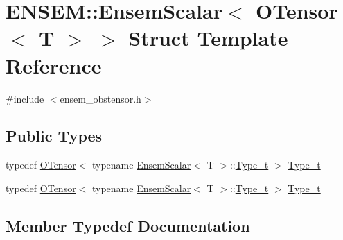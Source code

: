 \hypertarget{structENSEM_1_1EnsemScalar_3_01OTensor_3_01T_01_4_01_4}{}\section{E\+N\+S\+EM\+:\+:Ensem\+Scalar$<$ O\+Tensor$<$ T $>$ $>$ Struct Template Reference}
\label{structENSEM_1_1EnsemScalar_3_01OTensor_3_01T_01_4_01_4}


{\ttfamily \#include $<$ensem\+\_\+obstensor.\+h$>$}

\subsection*{Public Types}
\begin{DoxyCompactItemize}
\item 
typedef \mbox{\hyperlink{classENSEM_1_1OTensor}{O\+Tensor}}$<$ typename \mbox{\hyperlink{structENSEM_1_1EnsemScalar}{Ensem\+Scalar}}$<$ T $>$\+::\mbox{\hyperlink{structENSEM_1_1EnsemScalar_3_01OTensor_3_01T_01_4_01_4_ac7c2eed82696db6f601281499248ff83}{Type\+\_\+t}} $>$ \mbox{\hyperlink{structENSEM_1_1EnsemScalar_3_01OTensor_3_01T_01_4_01_4_ac7c2eed82696db6f601281499248ff83}{Type\+\_\+t}}
\item 
typedef \mbox{\hyperlink{classENSEM_1_1OTensor}{O\+Tensor}}$<$ typename \mbox{\hyperlink{structENSEM_1_1EnsemScalar}{Ensem\+Scalar}}$<$ T $>$\+::\mbox{\hyperlink{structENSEM_1_1EnsemScalar_3_01OTensor_3_01T_01_4_01_4_ac7c2eed82696db6f601281499248ff83}{Type\+\_\+t}} $>$ \mbox{\hyperlink{structENSEM_1_1EnsemScalar_3_01OTensor_3_01T_01_4_01_4_ac7c2eed82696db6f601281499248ff83}{Type\+\_\+t}}
\end{DoxyCompactItemize}


\subsection{Member Typedef Documentation}
\mbox{\label{structENSEM_1_1EnsemScalar_3_01OTensor_3_01T_01_4_01_4_ac7c2eed82696db6f601281499248ff83}} 
